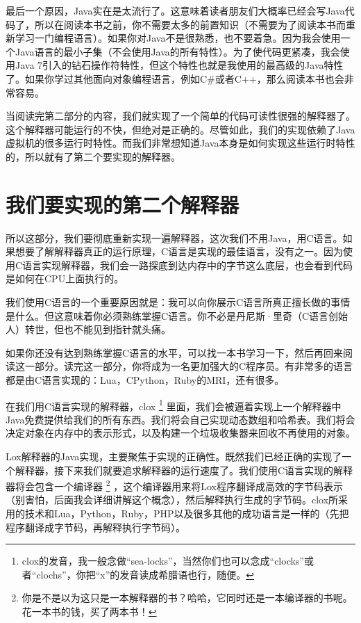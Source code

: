 \documentclass[cn,10pt,math=newtx,citestyle=gb7714-2015,bibstyle=gb7714-2015]{elegantbook}
\begin{document}
最后一个原因，Java实在是太流行了。这意味着读者朋友们大概率已经会写Java代码了，所以在阅读本书之前，你不需要太多的前置知识（不需要为了阅读本书而重新学习一门编程语言）。如果你对Java不是很熟悉，也不要着急。因为我会使用一个Java语言的最小子集（不会使用Java的所有特性）。为了使代码更紧凑，我会使用Java 7引入的钻石操作符特性，但这个特性也就是我使用的最高级的Java特性了。如果你学过其他面向对象编程语言，例如C\#或者C++，那么阅读本书也会非常容易。

当阅读完第二部分的内容，我们就实现了一个简单的代码可读性很强的解释器了。这个解释器可能运行的不快，但绝对是正确的。尽管如此，我们的实现依赖了Java虚拟机的很多运行时特性。而我们非常想知道Java本身是如何实现这些运行时特性的，所以就有了第二个要实现的解释器。

\section{我们要实现的第二个解释器}

所以这部分，我们要彻底重新实现一遍解释器，这次我们不用Java，用C语言。如果想要了解解释器真正的运行原理，C语言是实现的最佳语言，没有之一。因为使用C语言实现解释器，我们会一路探底到达内存中的字节这么底层，也会看到代码是如何在CPU上面执行的。

我们使用C语言的一个重要原因就是：我可以向你展示C语言所真正擅长做的事情是什么。但这意味着你必须熟练掌握C语言。你不必是丹尼斯·里奇（C语言创始人）转世，但也不能见到指针就头痛。

如果你还没有达到熟练掌握C语言的水平，可以找一本书学习一下，然后再回来阅读这一部分。读完这一部分，你将成为一名更加强大的C程序员。有非常多的语言都是由C语言实现的：Lua，CPython，Ruby的MRI，还有很多。

在我们用C语言实现的解释器，clox \footnote{clox的发音，我一般念做“sea-locks”，当然你们也可以念成“clocks”或者“clochs”，你把“x”的发音读成希腊语也行，随便。} 里面，我们会被逼着实现上一个解释器中Java免费提供给我们的所有东西。我们将会自己实现动态数组和哈希表。我们将会决定对象在内存中的表示形式，以及构建一个垃圾收集器来回收不再使用的对象。

Lox解释器的Java实现，主要聚焦于实现的正确性。既然我们已经正确的实现了一个解释器，接下来我们就要追求解释器的运行速度了。我们使用C语言实现的解释器将会包含一个编译器 \footnote{你是不是以为这只是一本解释器的书？哈哈，它同时还是一本编译器的书呢。花一本书的钱，买了两本书！} ，这个编译器用来将Lox程序翻译成高效的字节码表示（别害怕，后面我会详细讲解这个概念），然后解释执行生成的字节码。clox所采用的技术和Lua，Python，Ruby，PHP以及很多其他的成功语言是一样的（先把程序翻译成字节码，再解释执行字节码）。
\end{document}
